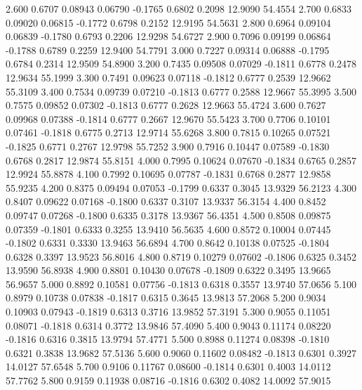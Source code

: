    2.600   0.6707   0.08943   0.06790  -0.1765   0.6802   0.2098  12.9090  54.4554
   2.700   0.6833   0.09020   0.06815  -0.1772   0.6798   0.2152  12.9195  54.5631
   2.800   0.6964   0.09104   0.06839  -0.1780   0.6793   0.2206  12.9298  54.6727
   2.900   0.7096   0.09199   0.06864  -0.1788   0.6789   0.2259  12.9400  54.7791
   3.000   0.7227   0.09314   0.06888  -0.1795   0.6784   0.2314  12.9509  54.8900
   3.200   0.7435   0.09508   0.07029  -0.1811   0.6778   0.2478  12.9634  55.1999
   3.300   0.7491   0.09623   0.07118  -0.1812   0.6777   0.2539  12.9662  55.3109
   3.400   0.7534   0.09739   0.07210  -0.1813   0.6777   0.2588  12.9667  55.3995
   3.500   0.7575   0.09852   0.07302  -0.1813   0.6777   0.2628  12.9663  55.4724
   3.600   0.7627   0.09968   0.07388  -0.1814   0.6777   0.2667  12.9670  55.5423
   3.700   0.7706   0.10101   0.07461  -0.1818   0.6775   0.2713  12.9714  55.6268
   3.800   0.7815   0.10265   0.07521  -0.1825   0.6771   0.2767  12.9798  55.7252
   3.900   0.7916   0.10447   0.07589  -0.1830   0.6768   0.2817  12.9874  55.8151
   4.000   0.7995   0.10624   0.07670  -0.1834   0.6765   0.2857  12.9924  55.8878
   4.100   0.7992   0.10695   0.07787  -0.1831   0.6768   0.2877  12.9858  55.9235
   4.200   0.8375   0.09494   0.07053  -0.1799   0.6337   0.3045  13.9329  56.2123
   4.300   0.8407   0.09622   0.07168  -0.1800   0.6337   0.3107  13.9337  56.3154
   4.400   0.8452   0.09747   0.07268  -0.1800   0.6335   0.3178  13.9367  56.4351
   4.500   0.8508   0.09875   0.07359  -0.1801   0.6333   0.3255  13.9410  56.5635
   4.600   0.8572   0.10004   0.07445  -0.1802   0.6331   0.3330  13.9463  56.6894
   4.700   0.8642   0.10138   0.07525  -0.1804   0.6328   0.3397  13.9523  56.8016
   4.800   0.8719   0.10279   0.07602  -0.1806   0.6325   0.3452  13.9590  56.8938
   4.900   0.8801   0.10430   0.07678  -0.1809   0.6322   0.3495  13.9665  56.9657
   5.000   0.8892   0.10581   0.07756  -0.1813   0.6318   0.3557  13.9740  57.0656
   5.100   0.8979   0.10738   0.07838  -0.1817   0.6315   0.3645  13.9813  57.2068
   5.200   0.9034   0.10903   0.07943  -0.1819   0.6313   0.3716  13.9852  57.3191
   5.300   0.9055   0.11051   0.08071  -0.1818   0.6314   0.3772  13.9846  57.4090
   5.400   0.9043   0.11174   0.08220  -0.1816   0.6316   0.3815  13.9794  57.4771
   5.500   0.8988   0.11274   0.08398  -0.1810   0.6321   0.3838  13.9682  57.5136
   5.600   0.9060   0.11602   0.08482  -0.1813   0.6301   0.3927  14.0127  57.6548
   5.700   0.9106   0.11767   0.08600  -0.1814   0.6301   0.4003  14.0112  57.7762
   5.800   0.9159   0.11938   0.08716  -0.1816   0.6302   0.4082  14.0092  57.9015
